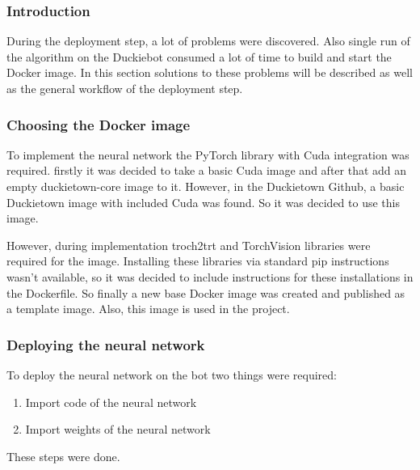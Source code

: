 \subsubsection{Introduction}
During the deployment step, a lot of problems were discovered. Also single run of the algorithm on the Duckiebot consumed a lot of time to build and start the Docker
image. In this section solutions to these problems will be described as well as the general workflow of the deployment step.
\subsubsection{Choosing the Docker image}
To implement the neural network the PyTorch library with Cuda integration was required.
firstly it was decided to take a basic Cuda image and after that add an empty duckietown-core image to it. However, in the Duckietown Github, a basic Duckietown image
with included Cuda was found. So it was decided to use this image. 

However, during implementation troch2trt and TorchVision libraries were required for the image. Installing these libraries via standard pip instructions wasn't available,
so it was decided to include instructions for these installations in the Dockerfile. So finally a new base Docker image was created and published as a template image.
Also, this image is used in the project.

\subsubsection{Deploying the neural network}
To deploy the neural network on the bot two things were required:
\begin{enumerate}
    \item Import code of the neural network
    \item Import weights of the neural network
\end{enumerate}
These steps were done. 

